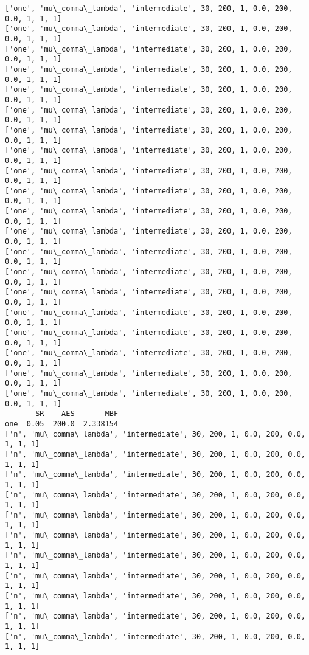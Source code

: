 \documentclass[11pt]{article}
\begin{document}
    \begin{Verbatim}[commandchars=\\\{\}]
['one', 'mu\_comma\_lambda', 'intermediate', 30, 200, 1, 0.0, 200, 0.0, 1, 1, 1]
['one', 'mu\_comma\_lambda', 'intermediate', 30, 200, 1, 0.0, 200, 0.0, 1, 1, 1]
['one', 'mu\_comma\_lambda', 'intermediate', 30, 200, 1, 0.0, 200, 0.0, 1, 1, 1]
['one', 'mu\_comma\_lambda', 'intermediate', 30, 200, 1, 0.0, 200, 0.0, 1, 1, 1]
['one', 'mu\_comma\_lambda', 'intermediate', 30, 200, 1, 0.0, 200, 0.0, 1, 1, 1]
['one', 'mu\_comma\_lambda', 'intermediate', 30, 200, 1, 0.0, 200, 0.0, 1, 1, 1]
['one', 'mu\_comma\_lambda', 'intermediate', 30, 200, 1, 0.0, 200, 0.0, 1, 1, 1]
['one', 'mu\_comma\_lambda', 'intermediate', 30, 200, 1, 0.0, 200, 0.0, 1, 1, 1]
['one', 'mu\_comma\_lambda', 'intermediate', 30, 200, 1, 0.0, 200, 0.0, 1, 1, 1]
['one', 'mu\_comma\_lambda', 'intermediate', 30, 200, 1, 0.0, 200, 0.0, 1, 1, 1]
['one', 'mu\_comma\_lambda', 'intermediate', 30, 200, 1, 0.0, 200, 0.0, 1, 1, 1]
['one', 'mu\_comma\_lambda', 'intermediate', 30, 200, 1, 0.0, 200, 0.0, 1, 1, 1]
['one', 'mu\_comma\_lambda', 'intermediate', 30, 200, 1, 0.0, 200, 0.0, 1, 1, 1]
['one', 'mu\_comma\_lambda', 'intermediate', 30, 200, 1, 0.0, 200, 0.0, 1, 1, 1]
['one', 'mu\_comma\_lambda', 'intermediate', 30, 200, 1, 0.0, 200, 0.0, 1, 1, 1]
['one', 'mu\_comma\_lambda', 'intermediate', 30, 200, 1, 0.0, 200, 0.0, 1, 1, 1]
['one', 'mu\_comma\_lambda', 'intermediate', 30, 200, 1, 0.0, 200, 0.0, 1, 1, 1]
['one', 'mu\_comma\_lambda', 'intermediate', 30, 200, 1, 0.0, 200, 0.0, 1, 1, 1]
['one', 'mu\_comma\_lambda', 'intermediate', 30, 200, 1, 0.0, 200, 0.0, 1, 1, 1]
['one', 'mu\_comma\_lambda', 'intermediate', 30, 200, 1, 0.0, 200, 0.0, 1, 1, 1]
       SR    AES       MBF
one  0.05  200.0  2.338154
['n', 'mu\_comma\_lambda', 'intermediate', 30, 200, 1, 0.0, 200, 0.0, 1, 1, 1]
['n', 'mu\_comma\_lambda', 'intermediate', 30, 200, 1, 0.0, 200, 0.0, 1, 1, 1]
['n', 'mu\_comma\_lambda', 'intermediate', 30, 200, 1, 0.0, 200, 0.0, 1, 1, 1]
['n', 'mu\_comma\_lambda', 'intermediate', 30, 200, 1, 0.0, 200, 0.0, 1, 1, 1]
['n', 'mu\_comma\_lambda', 'intermediate', 30, 200, 1, 0.0, 200, 0.0, 1, 1, 1]
['n', 'mu\_comma\_lambda', 'intermediate', 30, 200, 1, 0.0, 200, 0.0, 1, 1, 1]
['n', 'mu\_comma\_lambda', 'intermediate', 30, 200, 1, 0.0, 200, 0.0, 1, 1, 1]
['n', 'mu\_comma\_lambda', 'intermediate', 30, 200, 1, 0.0, 200, 0.0, 1, 1, 1]
['n', 'mu\_comma\_lambda', 'intermediate', 30, 200, 1, 0.0, 200, 0.0, 1, 1, 1]
['n', 'mu\_comma\_lambda', 'intermediate', 30, 200, 1, 0.0, 200, 0.0, 1, 1, 1]
['n', 'mu\_comma\_lambda', 'intermediate', 30, 200, 1, 0.0, 200, 0.0, 1, 1, 1]

\end{Verbatim}
\end{document}
